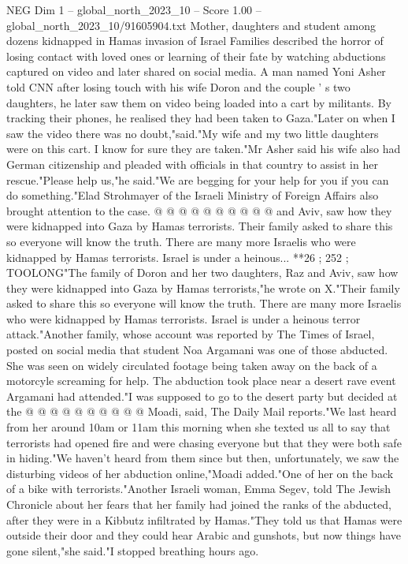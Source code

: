 \begin{textsample}{NEG Dim 1 – global\_north\_2023\_10 – Score 1.00 – global\_north\_2023\_10/91605904.txt}  \label{ex:f1_neg_129}
Mother, daughters and student among dozens kidnapped in Hamas invasion of Israel Families described the horror of losing contact with loved ones or learning of their fate by watching abductions captured on video and later shared on social media.
A man named Yoni Asher told CNN after losing touch with his wife Doron and the couple ' s two daughters, he later saw them on video being loaded into a cart by militants.
By tracking their phones, he realised they had been taken to Gaza."Later on when I saw the video there was no doubt,"said."My wife and my two little daughters were on this cart.
I know for sure they are taken."Mr Asher said his wife also had German citizenship and pleaded with officials in that country to assist in her rescue."Please help us,"he said."We are begging for your help for you if you can do something."Elad Strohmayer of the Israeli Ministry of Foreign Affairs also brought attention to the case. @ @ @ @ @ @ @ @ @ @ and Aviv, saw how they were kidnapped into Gaza by Hamas terrorists.
Their family asked to share this so everyone will know the truth.
There are many more Israelis who were kidnapped by Hamas terrorists.
Israel is under a heinous... **26 ; 252 ; TOOLONG"The family of Doron and her two daughters, Raz and Aviv, saw how they were kidnapped into Gaza by Hamas terrorists,"he wrote on X."Their family asked to share this so everyone will know the truth.
There are many more Israelis who were kidnapped by Hamas terrorists.
Israel is under a heinous terror attack."Another family, whose account was reported by The Times of Israel, posted on social media that student Noa Argamani was one of those abducted.
She was seen on widely circulated footage being taken away on the back of a motorcyle screaming for help.
The abduction took place near a desert rave event Argamani had attended."I was supposed to go to the desert party but decided at the @ @ @ @ @ @ @ @ @ @ Moadi, said, The Daily Mail reports."We last heard from her around 10am or 11am this morning when she texted us all to say that terrorists had opened fire and were chasing everyone but that they were both safe in hiding."We haven't heard from them since but then, unfortunately, we saw the disturbing videos of her abduction online,"Moadi added."One of her on the back of a bike with terrorists."Another Israeli woman, Emma Segev, told The Jewish Chronicle about her fears that her family had joined the ranks of the abducted, after they were in a Kibbutz infiltrated by Hamas."They told us that Hamas were outside their door and they could hear Arabic and gunshots, but now things have gone silent,"she said."I stopped breathing hours ago.

\end{textsample}
